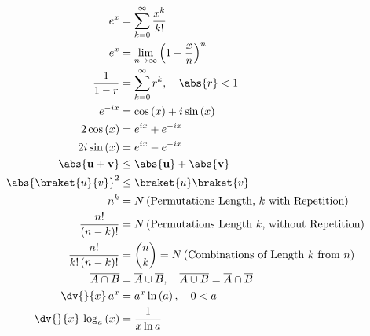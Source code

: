 \begin{subequations}\label{eq:additional:misc:math}
\begin{align}
e^{x} &= \sum_{k=0}^{\infty} \frac{x^{k}}{k!} \label{eq:additional:misc:math:ex} \\
e^{x} &= \lim_{n \to \infty} \left(1 + \frac{x}{n}\right)^{n} \label{eq:additional:misc:math:ex_limit} \\
\frac{1}{1-r} &= \sum_{k=0}^{\infty} r^{k}, \quad \abs{r} < 1 \label{eq:additional:misc:math:geometric} \\
e^{-i x} &= \cos\left(x\right) + i \sin\left(x\right) \label{eq:additional:misc:math:eulers_formula} \\
2 \cos\left(x\right) &= e^{i x} + e^{-i x} \label{eq:additional:misc:math:cos_exp} \\
2i \sin\left(x\right) &= e^{i x} - e^{-i x} \label{eq:additional:misc:math:sin_exp} \\
\abs{\mathbf{u} + \mathbf{v}} &\leq \abs{\mathbf{u}} + \abs{\mathbf{v}} \label{eq:additional:misc:math:triangle_inequality} \\
\abs{\braket{u}{v}}^{2} &\leq \braket{u} \braket{v} \label{eq:additional:misc:math:cauchy_schwarz_inequality} \\
n^{k} &= N\left(\text{Permutations Length, $k$ with Repetition}\right) \label{eq:additional:misc:math:permutations_with_repetition} \\
\frac{n!}{\left(n-k\right)!} &= N\left(\text{Permutations Length $k$, without Repetition}\right) \label{eq:additional:misc:math:permutations_without_repetition} \\
\frac{n!}{k!\left(n-k\right)!} &= {n \choose k} = N\left(\text{Combinations of Length $k$ from $n$}\right) \label{eq:additional:misc:math:binomial_coefficient} \\
\overline{A \cap B} &= \overline{A} \cup \overline{B},\quad \overline{A \cup B} = \overline{A} \cap \overline{B} \label{eq:additional:misc:math:de_morgan} \\
\dv{}{x}\, a^{x} &= a^{x} \ln\left(a\right), \quad 0 < a \label{eq:additional:misc:math:diff_exp_gen} \\
\dv{}{x}\, \log_{a}\left(x\right) &= \frac{1}{x \ln a} \label{eq:additional:misc:math:diff_log_gen}
\end{align}
\end{subequations}
